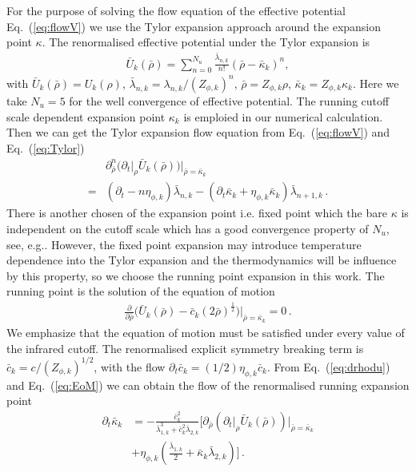 \documentclass[%
reprint,
superscriptaddress,
showpacs,preprintnumbers,
 amsmath,amssymb,
 aps,
prd,
]{revtex4-1}
\def\Eq#1{Eq.~(\ref{#1})}
\begin{document}
For the purpose of solving the flow equation of the effective potential \Eq{eq:flowV} we use the Tylor expansion approach around the expansion point $\kappa$. The renormalised effective potential under the Tylor expansion is
\begin{align}
\bar{U}_k(\bar{\rho})=\sum^{N_u}_{n=0}\frac{\bar{\lambda}_{n,k}}{n!}(\bar{\rho}-\bar{\kappa}_k)^n,\label{eq:Tylor}
\end{align}
with $\bar{U}_k(\bar{\rho})=U_k(\rho)$, $\bar{\lambda}_{n,k}=\lambda_{n,k}/(Z_{\phi,k})^n$, $\bar{\rho}=Z_{\phi,k}\rho$, $\bar{\kappa}_k=Z_{\phi,k}\kappa_k$.
Here we take $N_u=5$ for the well convergence of effective potential. The running cutoff scale dependent expansion point $\kappa_k$ is emploied in our numerical calculation. Then we can get the Tylor expansion flow equation from \Eq{eq:flowV} and \Eq{eq:Tylor} 
\begin{align}
&\partial^n_{\bar{\rho}}\bigg(\partial_t |_\rho\bar{U}_k(\bar{\rho})\bigg)\bigg|_{\bar{\rho}=\bar{\kappa}_k}\nonumber\\[2ex]
=&(\partial_t-n\eta_{\phi,k})\bar{\lambda}_{n,k}-(\partial_t\bar{\kappa}_k+\eta_{\phi,k}\bar{\kappa}_k)\bar{\lambda}_{n+1,k}\,.\label{eq:drhodu}
\end{align}
There is another chosen of the expansion point i.e. fixed point which the bare $\kappa$ is independent on the cutoff scale which has a good convergence property of $N_u$, see, e.g.\cite{Pawlowski:2014zaa,Yin:2019ebz}. However, the fixed point expansion may introduce temperature dependence into the Tylor expansion and the thermodynamics will be influence by this property, so we choose the running point expansion in this work. The running point is the solution of the equation of motion
\begin{align}
\frac{\partial}{\partial \bar{\rho}}\bigg( \bar{U}_k(\bar{\rho})-\bar{c}_k(2\bar{\rho})^{\frac{1}{2}}\bigg)\bigg|_{\bar{\rho}=\bar{\kappa}_k}=0\,.\label{eq:EoM}
\end{align}
We emphasize that the equation of motion must be satisfied under every value of the infrared cutoff. The renormalised explicit symmetry breaking term is $\bar{c}_k=c/(Z_{\phi,k})^{1/2}$, with the flow $\partial_t \bar{c}_k=(1/2)\eta_{\phi,k}\bar{c}_k$. From \Eq{eq:drhodu} and \Eq{eq:EoM} we can obtain the flow of the renormalised running expansion point
\begin{align}
  \partial_t \bar \kappa_k&=-\frac{\bar c_k^2}{\bar{\lambda}_{1,k}^3+\bar c_k^2\bar{\lambda}_{2,k}}\bigg[\partial_{\bar \rho}\left(\partial_t\big|_{\rho} \bar U_k(\bar \rho)\right)\bigg|_{\bar \rho=\bar \kappa_k}\nonumber \\[2ex]
  &+\eta_{\phi,k}\left(\frac{\bar{\lambda}_{1,k}}{2}+\bar\kappa_k\bar{\lambda}_{2,k}\right)\bigg]\,.\label{}
\end{align}
\end{document}
